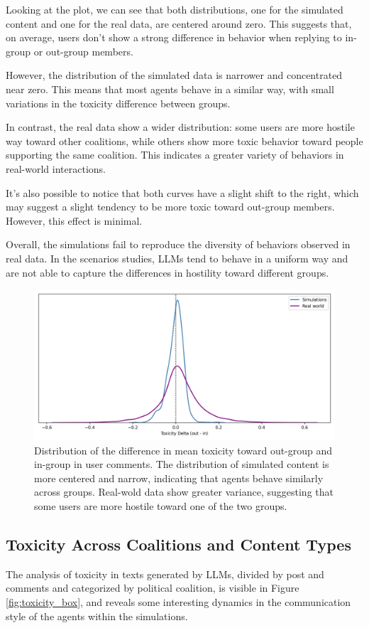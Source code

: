 Looking at the plot, we can see that both distributions, one for the simulated content and one for the real data, are centered around zero.
This suggests that, on average, users don't show a strong difference in behavior when replying to in-group or out-group members.

However, the distribution of the simulated data is narrower and concentrated near zero.
This means that most agents behave in a similar way, with small variations in the toxicity difference between groups.

In contrast, the real data show a wider distribution: some users are more hostile way toward other coalitions, while others show more toxic behavior toward people supporting the same coalition.
This indicates a greater variety of behaviors in real-world interactions.

It's also possible to notice that both curves have a slight shift to the right, which may suggest a slight tendency to be more toxic toward out-group members. However, this effect is minimal.

Overall, the simulations fail to reproduce the diversity of behaviors observed in real data. 
In the scenarios studies, LLMs tend to behave in a uniform way and are not able to capture the differences in hostility toward different groups.


\begin{figure}[h]
    \centering
    \includegraphics[width=0.6\linewidth]{Images/Toxicity/diff_in_out_combined.png}
    \caption{
    Distribution of the difference in mean toxicity toward out-group and in-group in user comments.
    The distribution of simulated content is more centered and narrow, indicating that agents behave similarly across groups.
    Real-wold data show greater variance, suggesting that some users are more hostile toward one of the two groups.
    }
    \label{fig:toxicity_in_out}
\end{figure}


\subsection{Toxicity Across Coalitions and Content Types}
The analysis of toxicity in texts generated by LLMs, divided by post and comments and categorized by political coalition, is visible in Figure \ref{fig:toxicity_box}, and reveals some interesting dynamics in the communication style of the agents within the simulations.

